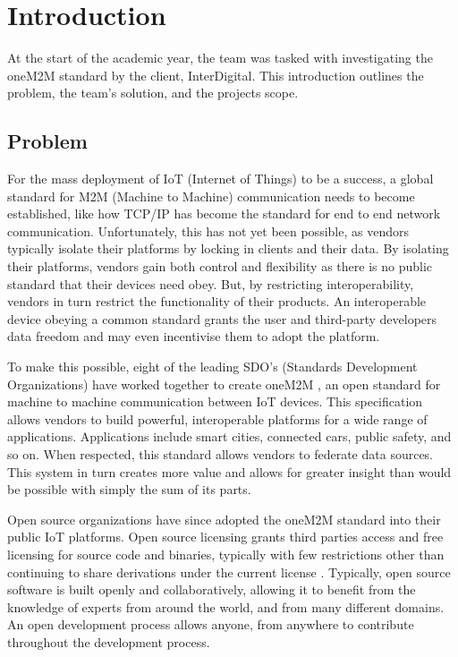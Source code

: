 \chapter{Introduction}


At the start of the academic year, the team was tasked with investigating the oneM2M standard by the client, InterDigital. This introduction outlines the problem, the team's solution, and the projects scope.

\section{Problem}

For the mass deployment of IoT (Internet of Things) to be a success, a global standard for M2M (Machine to Machine) communication needs to become established, like how TCP/IP has become the standard for end to end network communication. Unfortunately, this has not yet been possible, as vendors typically isolate their platforms by locking in clients and their data. By isolating their platforms, vendors gain both control and flexibility as there is no public standard that their devices need obey. But, by restricting interoperability, vendors in turn restrict the functionality of their products. An interoperable device obeying a common standard grants the user and third-party developers data freedom and may even incentivise them to adopt the platform.

To make this possible, eight of the leading SDO's (Standards Development Organizations) have worked together to create oneM2M \cite{oneM2M2017OneM2MChain}, an open standard for machine to machine communication between IoT devices. This specification allows vendors to build powerful, interoperable platforms for a wide range of applications. Applications include smart cities, connected cars, public safety, and so on. When respected, this standard allows vendors to federate data sources. This system in turn creates more value and allows for greater insight than would be possible with simply the sum of its parts.

Open source organizations have since adopted the oneM2M standard into their public IoT platforms. Open source licensing grants third parties access and free licensing for source code and binaries, typically with few restrictions other than continuing to share derivations under the current license \cite{LernerTheBeyond}. Typically, open source software is built openly and collaboratively, allowing it to benefit from the knowledge of experts from around the world, and from many different domains. An open development process allows anyone, from anywhere to contribute throughout the development process.

